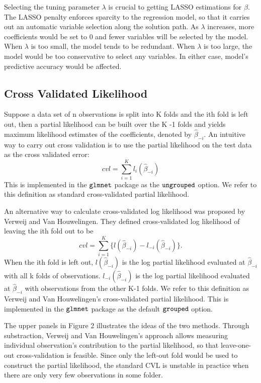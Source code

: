 Selecting the tuning parameter $\lambda$ is crucial to getting LASSO estimations for $\beta$. The LASSO penalty enforces sparcity to the regression model, so that it carries out an automatic variable selection along the solution path. As $\lambda$ increases, more coefficients would be set to 0 and fewer variables will be selected by the model. When $\lambda$ is too small, the model tends to be redundant. When $\lambda$ is too large, the model would be too conservative to select any variables. In either case, model's predictive accuracy would be affected.

\subsection{Cross Validated Likelihood} 
\label{Sec:cox-cv-existing}

Suppose a data set of n observations is split into K folds and the ith fold is left out, then a partial likelihood can be built over the K -1 folds and yields maximum likelihood estimates of the coefficients, denoted by $\hat{\beta}_{-i}$. An intuitive way to carry out cross validation is to use the partial likelihood on the test data as the cross validated error: \begin{equation}cvl = \sum_{i=1}^{K} l_{i}(\hat{\beta}_{-i})\end{equation} This is implemented in the $\tt{glmnet}$ package as the $\tt{ungrouped}$ option. We refer to this definition as standard cross-validated partial likelihood.

An alternative way to calculate cross-validated log likelihood was proposed by Verweij and Van Houwelingen. They defined cross-validated log likelihood of leaving the ith fold out to be \begin{equation}cvl = \sum_{i=1}^{K} \{l(\hat{\beta}_{-i}) - l_{-i}(\hat{\beta}_{-i})\}. \end{equation} When the ith fold is left out, $l(\hat{\beta}_{-i})$ is the log partial likelihood evaluated at $\hat{\beta}_{-i}$ with all k folds of observations. $l_{-i}(\hat{\beta}_{-i})$ is the log partial likelihood evaluated at $\hat{\beta}_{-i}$ with observations from the other K-1 folds. We refer to this definition as Verweij and Van Houwelingen's cross-validated partial likelihood. This is implemented in the $\tt{glmnet}$ package as the default $\tt{grouped}$ option.

\par The upper panels in Figure 2 illustrates the ideas of the two methods. Through substraction, Verweij and Van Houwelingen's approach allows measuring individual observation's contribution to the partial likelihood, so that leave-one-out cross-validation is feasible. Since only the left-out fold would be used to construct the partial likelihood, the standard CVL is unstable in practice when there are only very few observations in some folder. 

